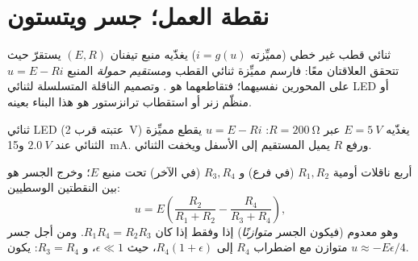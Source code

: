 \section{نقطة العمل؛ جسر ويتستون}

\begin{method}\label{met:b1:dc-circuits:loadline}
ثنائي قطب غير خطي (مميِّزته $i = g(u)$) يغذّيه منبع
تيفنان $(E, R)$ يستقرّ حيث تتحقق العلاقتان معًا: فارسم مميِّزة ثنائي
القطب و\emph{مستقيم حمولة} المنبع $u = E - Ri$ على
المحورين نفسيهما؛ فتقاطعهما هو \emph{}. وتصميم
الناقلة المتسلسلة لثنائي LED أو منظّم زنر أو استقطاب ترانزستور
هو هذا البناء بعينه.
\end{method}

\begin{omfigure}

{\small ثنائي LED (عتبته قرب \qty{2}{V}) يغذّيه $E = \qty{5}{V}$
عبر $R = \qty{200}{\ohm}$:  $u = E - Ri$ يقطع
مميِّزة الثنائي عند $\qty{2.0}{V}$ و\qty{15}{mA}. ورفع $R$
يميل المستقيم إلى الأسفل ويخفت الثنائي.}
\end{omfigure}

\begin{proposition}\label{prop:b1:dc-circuits:wheatstone}
أربع ناقلات أومية $R_1, R_2$ (في فرع) و $R_3, R_4$ (في الآخر) تحت
منبع $E$؛ وخرج الجسر هو  بين النقطتين
الوسطيين:
\[
u = E\left(\frac{R_2}{R_1 + R_2} - \frac{R_4}{R_3 + R_4}\right),
\]
وهو معدوم (فيكون الجسر \emph{متوازنًا}) إذا وفقط إذا كان $R_1R_4 = R_2R_3$. ومن أجل
جسر متوازن مع اضطراب $R_4$ إلى $R_4(1 + \epsilon)$، حيث $\epsilon
\ll 1$، و $R_3 = R_4$: يكون $u \approx -E\epsilon/4$.
\end{proposition}

